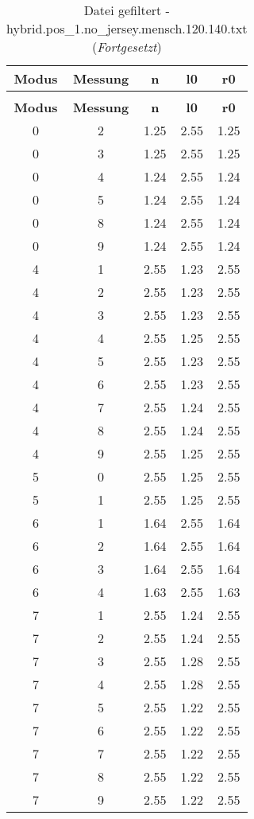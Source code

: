 \begin{longtable}{|c|c||c||c||c|}
	\caption{Datei gefiltert - hybrid.pos\_1.no\_jersey.mensch.120.140.txt} \label{tab:hybrid.pos-1.no-jersey.mensch.120.140.txt} \\ \hline
	\textbf{Modus} & \textbf{Messung} & \textbf{n} & \textbf{l0} & \textbf{r0}\\ \hline
	\endfirsthead
	\caption[]{Datei gefiltert - hybrid.pos\_1.no\_jersey.mensch.120.140.txt (\emph{Fortgesetzt})} \\ \hline
	\textbf{Modus} & \textbf{Messung} & \textbf{n} & \textbf{l0} & \textbf{r0}\\ \hline
	\endhead
	0 & 2 & 1.25 & 2.55 & 1.25 \\ \hline
	0 & 3 & 1.25 & 2.55 & 1.25 \\ \hline
	0 & 4 & 1.24 & 2.55 & 1.24 \\ \hline
	0 & 5 & 1.24 & 2.55 & 1.24 \\ \hline
	0 & 8 & 1.24 & 2.55 & 1.24 \\ \hline
	0 & 9 & 1.24 & 2.55 & 1.24 \\ \hline
	4 & 1 & 2.55 & 1.23 & 2.55 \\ \hline
	4 & 2 & 2.55 & 1.23 & 2.55 \\ \hline
	4 & 3 & 2.55 & 1.23 & 2.55 \\ \hline
	4 & 4 & 2.55 & 1.25 & 2.55 \\ \hline
	4 & 5 & 2.55 & 1.23 & 2.55 \\ \hline
	4 & 6 & 2.55 & 1.23 & 2.55 \\ \hline
	4 & 7 & 2.55 & 1.24 & 2.55 \\ \hline
	4 & 8 & 2.55 & 1.24 & 2.55 \\ \hline
	4 & 9 & 2.55 & 1.25 & 2.55 \\ \hline
	5 & 0 & 2.55 & 1.25 & 2.55 \\ \hline
	5 & 1 & 2.55 & 1.25 & 2.55 \\ \hline
	6 & 1 & 1.64 & 2.55 & 1.64 \\ \hline
	6 & 2 & 1.64 & 2.55 & 1.64 \\ \hline
	6 & 3 & 1.64 & 2.55 & 1.64 \\ \hline
	6 & 4 & 1.63 & 2.55 & 1.63 \\ \hline
	7 & 1 & 2.55 & 1.24 & 2.55 \\ \hline
	7 & 2 & 2.55 & 1.24 & 2.55 \\ \hline
	7 & 3 & 2.55 & 1.28 & 2.55 \\ \hline
	7 & 4 & 2.55 & 1.28 & 2.55 \\ \hline
	7 & 5 & 2.55 & 1.22 & 2.55 \\ \hline
	7 & 6 & 2.55 & 1.22 & 2.55 \\ \hline
	7 & 7 & 2.55 & 1.22 & 2.55 \\ \hline
	7 & 8 & 2.55 & 1.22 & 2.55 \\ \hline
	7 & 9 & 2.55 & 1.22 & 2.55 \\ \hline
\end{longtable}


